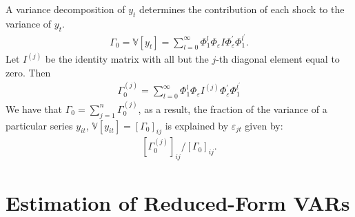 A variance decomposition of $y_t$ determines the contribution of each shock to the variance of $y_t$.
\begin{gather*}
    \Gamma_0 = \mathbb{V}[y_t] = \sum_{l=0}^{\infty} \Phi_1^l \Phi_\varepsilon I \Phi_\varepsilon^{\prime} \Phi_1^{l^\prime}.
\end{gather*}
Let $I^{(j)}$ be the identity matrix with all but the $j$-th diagonal element equal to zero. Then
\begin{gather*}
    \Gamma_0^{(j)} = \sum_{l=0}^{\infty} \Phi_1^l \Phi_\varepsilon I^{(j)} \Phi_\varepsilon^{\prime} \Phi_1^{l^\prime}
\end{gather*}
We have that $\Gamma_0 = \sum_{j=1}^{n} \Gamma_0^{(j)}$, as a result,
the fraction of the variance of a particular series $y_{it}$, $\mathbb{V}[y_{it}] = \left[\Gamma_0\right]_{ij}$ is explained by $\varepsilon_{jt}$ given by:
\begin{gather*}
    \left[\Gamma_0^{(j)}\right]_{ij} / \left[\Gamma_0\right]_{ij}.
\end{gather*}

\section{Estimation of Reduced-Form VARs}
\label{sec:estimation-var}


